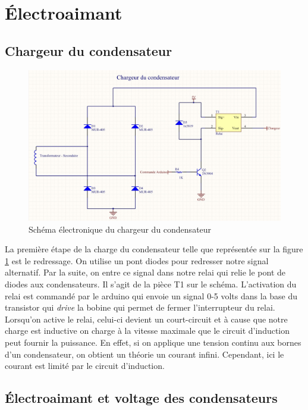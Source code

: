 
\section{Électroaimant}

\subsection{Chargeur du condensateur}

  \begin{figure}[ht]
    \centering
    \includegraphics[scale=0.4]{resources/chargeur.jpg}
    \caption{Schéma électronique du chargeur du condensateur}
    \label{fig:chargeur}
  \end{figure}

La première étape de la charge du condensateur telle que représentée sur la figure \ref{fig:chargeur} est le redressage. On utilise un pont diodes pour redresser notre signal alternatif. Par la suite, on entre ce signal dans notre relai qui relie le pont de diodes aux condensateurs. Il s'agit de la pièce T1 sur le schéma. L'activation du relai est commandé par le arduino qui envoie un signal 0-5 volts dans la base du transistor qui \textit{drive} la bobine qui permet de fermer l'interrupteur du relai. Lorsqu'on active le relai, celui-ci devient un court-circuit et à cause que notre charge est inductive on charge à la vitesse maximale que le circuit d'induction peut fournir la puissance. En effet, si on applique une tension continu aux bornes d'un condensateur, on obtient un théorie un courant infini. Cependant, ici le courant est limité par le circuit d'induction.

\subsection{Électroaimant et voltage des condensateurs}

